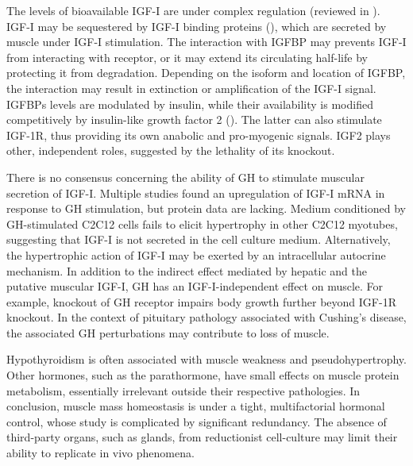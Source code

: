 \documentclass[12pt,english]{report}\usepackage[]{graphicx}\usepackage[]{color}
\begin{document}
The levels of bioavailable IGF-I are under complex regulation (reviewed
in \citep{chao2008igf2:,velloso2008regulation}). IGF-I may be sequestered
by IGF-I binding proteins (),
which are secreted by muscle under IGF-I stimulation\citep{tomas1992insulin-like}.
The interaction with IGFBP may prevents IGF-I from interacting with
receptor, or it may extend its circulating half-life by protecting
it from degradation. Depending on the isoform and location of IGFBP,
the interaction may result in extinction or amplification of the IGF-I
signal. IGFBPs levels are modulated by insulin, while their availability
is modified competitively by insulin-like growth factor 2 ().
The latter can also stimulate IGF-1R, thus providing its own anabolic
and pro-myogenic signals\citep{wilson2003autocrine}. IGF2 plays other,
independent roles, suggested by the lethality of its knockout\citep{dechiara1991parental}.

There is no consensus concerning the ability of GH to stimulate muscular
secretion of IGF-I. Multiple studies found an upregulation of IGF-I
mRNA in response to GH stimulation\citep{imanaka2008growth,resmini2011identification},
but protein data are lacking. Medium conditioned by GH-stimulated
C2C12 cells fails to elicit hypertrophy in other C2C12 myotubes\citep{sotiropoulos2006growth},
suggesting that IGF-I is not secreted in the cell culture medium.
Alternatively, the hypertrophic action of IGF-I may be exerted by
an intracellular autocrine mechanism. In addition to the indirect
effect mediated by hepatic and the putative muscular IGF-I, GH has
an IGF-I-independent effect on muscle. For example, knockout of GH
receptor impairs body growth further beyond IGF-1R knockout\citep{lupu2001roles}.
In the context of pituitary pathology associated with Cushing's disease,
the associated GH perturbations may contribute to loss of muscle. 

Hypothyroidism is often associated with muscle weakness and pseudohypertrophy\citep{mastropasqua2003hoffmans}.
Other hormones, such as the parathormone, have small effects on muscle
protein metabolism, essentially irrelevant outside their respective
pathologies\citep{garber1983effects}. In conclusion, muscle mass
homeostasis is under a tight, multifactorial hormonal control, whose
study is complicated by significant redundancy. The absence of third-party
organs, such as glands, from reductionist cell-culture may limit their
ability to replicate in vivo phenomena.
\end{document}
